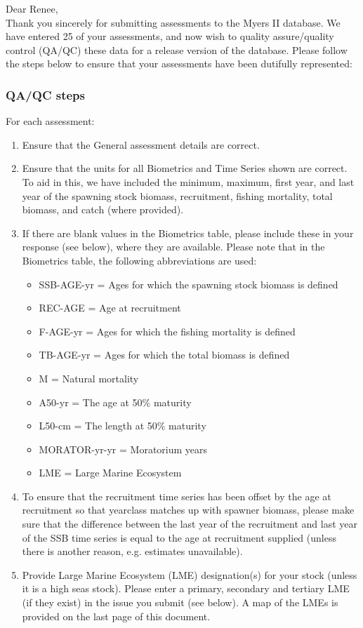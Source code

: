 \documentclass [a4paper, 10pt] {article}
\begin{document}
\noindent Dear Renee,\\

\noindent Thank you sincerely for submitting assessments to the Myers II database. We have entered 25 of your assessments, and now wish to quality assure/quality control (QA/QC) these data for a release version of the database. Please follow the steps below to ensure that your assessments have been dutifully represented:
\subsubsection{QA/QC steps}
For each assessment:
\begin{enumerate}
\item Ensure that the General assessment details are correct.
\item Ensure that the units for all Biometrics and Time Series shown are correct. To aid in this, we have included the minimum, maximum, first year, and last year of the spawning stock biomass, recruitment, fishing mortality, total biomass, and  catch  (where provided). 
\item If there are blank values in the Biometrics table, please include these in your response (see below), where they are available.
Please note that in the Biometrics table, the following abbreviations are used:
\begin{itemize}
\item SSB-AGE-yr  = Ages for which the spawning stock biomass is defined
\item REC-AGE     = Age at recruitment
\item F-AGE-yr    = Ages for which the fishing mortality is defined 
\item TB-AGE-yr   = Ages for which the total biomass is defined
\item M      = Natural mortality
\item A50-yr      = The age at 50\% maturity
\item L50-cm      = The length at 50\% maturity
\item MORATOR-yr-yr = Moratorium years
\item LME = Large Marine Ecosystem\\
\end{itemize}
\item To ensure that the recruitment time series has been offset by the age at recruitment so that yearclass matches up with spawner biomass, please make sure that the difference between the last year of the recruitment and last year of the SSB time series is equal to the age at recruitment supplied (unless there is another reason, e.g. estimates unavailable). 
\item Provide Large Marine Ecosystem (LME) designation(s) for your stock (unless it is a high seas stock). Please enter a primary, secondary and tertiary LME (if they exist) in the issue you submit (see below). A map of the LMEs is provided on the last page of this document. 
\end{enumerate}
\vspace{-.25in}
\end{document}
